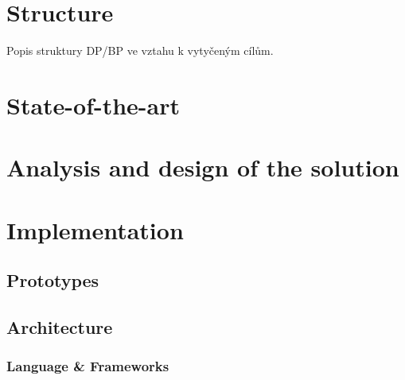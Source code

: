 \documentclass[11pt,oneside,a4paper]{book}
\begin{document}
	
	\chapter{Structure}
	
	Popis struktury DP/BP ve vztahu k vytyčeným cílům.
	
	\chapter{State-of-the-art}
	
	\chapter{Analysis and design of the solution}
	
	\chapter{Implementation}
	\section{Prototypes}
	\subsection{\reversegeo}
	\subsection{\gps}
	\subsection{\poi}
	\section{Architecture}
	\subsection{Language \& Frameworks}
\end{document}
